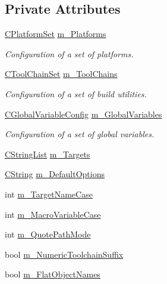\subsection*{Private Attributes}
\begin{DoxyCompactItemize}
\item 
\hyperlink{classCPlatformSet}{C\-Platform\-Set} \hyperlink{classCCodeBlocksBuildConfig_a5d1a73a8b99b2a8f7c9b8b6e68c9ee0a}{m\-\_\-\-Platforms}
\begin{DoxyCompactList}\small\item\em Configuration of a set of platforms. \end{DoxyCompactList}\item 
\hyperlink{classCToolChainSet}{C\-Tool\-Chain\-Set} \hyperlink{classCCodeBlocksBuildConfig_a6228c5d7803e50f70065f6fe9e24c4be}{m\-\_\-\-Tool\-Chains}
\begin{DoxyCompactList}\small\item\em Configuration of a set of build utilities. \end{DoxyCompactList}\item 
\hyperlink{classCGlobalVariableConfig}{C\-Global\-Variable\-Config} \hyperlink{classCCodeBlocksBuildConfig_ac534f72effbbb05a79e9af4c04b93f4d}{m\-\_\-\-Global\-Variables}
\begin{DoxyCompactList}\small\item\em Configuration of a set of global variables. \end{DoxyCompactList}\item 
\hyperlink{classCStringList}{C\-String\-List} \hyperlink{classCCodeBlocksBuildConfig_adf02e1f9a0346b2d25ced81343fe4d89}{m\-\_\-\-Targets}
\item 
\hyperlink{classCString}{C\-String} \hyperlink{classCCodeBlocksBuildConfig_a4f4a79145c1b7bd90881901f9ae98bb5}{m\-\_\-\-Default\-Options}
\item 
int \hyperlink{classCCodeBlocksBuildConfig_a07127c9e222fe5fa3e2e0b7a2b6f50e4}{m\-\_\-\-Target\-Name\-Case}
\item 
int \hyperlink{classCCodeBlocksBuildConfig_a00d5c77aff64f3647cca2d9c0aaf37d7}{m\-\_\-\-Macro\-Variable\-Case}
\item 
int \hyperlink{classCCodeBlocksBuildConfig_ac52ed092d08ce6778dcb901dea2130d2}{m\-\_\-\-Quote\-Path\-Mode}
\item 
bool \hyperlink{classCCodeBlocksBuildConfig_ac4e930aa6e42094e6f40d29d2f373da6}{m\-\_\-\-Numeric\-Toolchain\-Suffix}
\item 
bool \hyperlink{classCCodeBlocksBuildConfig_a1e3f7ffab14887951b2d8d743354e786}{m\-\_\-\-Flat\-Object\-Names}

\end{DoxyCompactItemize}
